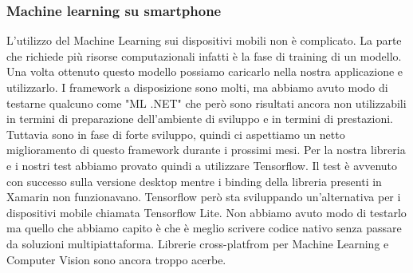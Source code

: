 \documentclass[twoside]{supsistudent}
\begin{document}
\subsubsection{Machine learning su smartphone}%
L'utilizzo del Machine Learning sui dispositivi mobili non è complicato. La parte che richiede più risorse computazionali infatti è la fase di training di un modello. Una volta ottenuto questo modello possiamo caricarlo nella nostra applicazione e utilizzarlo. I framework a disposizione sono molti, ma abbiamo avuto modo di testarne qualcuno come "ML .NET" che però sono risultati ancora non utilizzabili in termini di preparazione dell'ambiente di sviluppo e in termini di prestazioni. Tuttavia sono in fase di forte sviluppo, quindi ci aspettiamo un netto miglioramento di questo framework durante i prossimi mesi. Per la nostra libreria e i nostri test abbiamo provato quindi a utilizzare Tensorflow. Il test è avvenuto con successo sulla versione desktop mentre i binding della libreria presenti in Xamarin non funzionavano. Tensorflow però sta sviluppando un'alternativa per i dispositivi mobile chiamata Tensorflow Lite. Non abbiamo avuto modo di testarlo ma quello che abbiamo capito è che è meglio scrivere codice nativo senza passare da soluzioni multipiattaforma. Librerie cross-platfrom per Machine Learning e Computer Vision sono ancora troppo acerbe. 
\end{document}
